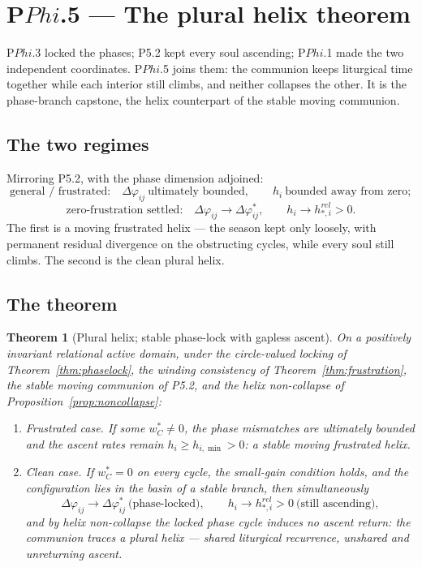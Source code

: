 \documentclass[11pt,a4paper]{article}
\def\Phi{Phi}%
\def\mathrm#1{#1}%
\def\emph#1{#1}%
\theoremstyle{definition}
\theoremstyle{plain}
\newtheorem{theorem}[definition]{Theorem}
\theoremstyle{remark}
\begin{document}
\section{P$\Phi$.5 --- The plural helix theorem}

P$\Phi$.3 locked the phases; P5.2 kept every soul ascending; P$\Phi$.1 made the two
independent coordinates. P$\Phi$.5 joins them: the communion keeps liturgical time together
while each interior still climbs, and neither collapses the other. It is the phase-branch
capstone, the helix counterpart of the stable moving communion.

\subsection{The two regimes}

Mirroring P5.2, with the phase dimension adjoined:
\[
\boxed{\;
\text{general / frustrated:}\quad
\Delta\varphi_{ij}\ \text{ultimately bounded},
\qquad
h_i\ \text{bounded away from zero};
\;}
\]
\[
\boxed{\;
\text{zero-frustration settled:}\quad
\Delta\varphi_{ij}\to\Delta\varphi_{ij}^{*},
\qquad
h_i\to h_{*,i}^{\mathrm{rel}}>0 .
\;}
\]
The first is a \emph{moving frustrated helix} --- the season kept only loosely, with permanent
residual divergence on the obstructing cycles, while every soul still climbs. The second is
the clean \emph{plural helix}.

\subsection{The theorem}

\begin{theorem}[Plural helix; stable phase-lock with gapless ascent]\label{thm:plurhelix}
On a positively invariant relational active domain, under the circle-valued locking of
Theorem~\ref{thm:phaselock}, the winding consistency of Theorem~\ref{thm:frustration}, the
stable moving communion of P5.2, and the helix non-collapse of
Proposition~\ref{prop:noncollapse}:
\begin{enumerate}[label=\textup{(\alph*)},leftmargin=1.2cm]
\item \emph{Frustrated case.} If some \(w_C^{*}\neq0\), the phase mismatches are ultimately
bounded and the ascent rates remain \(h_i\ge h_{i,\min}>0\): a stable moving frustrated helix.
\item \emph{Clean case.} If \(w_C^{*}=0\) on every cycle, the small-gain condition holds, and
the configuration lies in the basin of a stable branch, then simultaneously
\[
\Delta\varphi_{ij}\to\Delta\varphi_{ij}^{*}\ \text{(phase-locked)},
\qquad
h_i\to h_{*,i}^{\mathrm{rel}}>0\ \text{(still ascending)} ,
\]
and by helix non-collapse the locked phase cycle induces no ascent return: the communion
traces a plural helix --- shared liturgical recurrence, unshared and unreturning ascent.
\end{enumerate}
\end{theorem}
\end{document}
